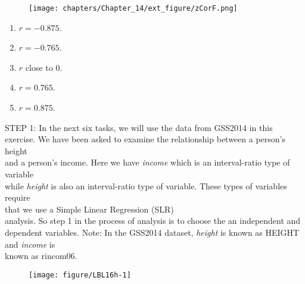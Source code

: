 \documentclass[11pt]{book}\usepackage[]{graphicx}\usepackage[]{color}
\begin{document}
\begin{exercises}
\begin{exercise}
\begin{figure}[htbp] %
   \centering
   \texttt{[image: chapters/Chapter\_14/ext\_figure/zCorF.png]}
   \label{fig:f12_14}
\end{figure}

      \begin{enumerate}
      \item $r = -0.875$.
      \item $r = -0.765$.
      \item $r$ close to 0.
      \item $r = 0.765$.
      \item $r = 0.875$.
      \end{enumerate}



    \end{exercise}
    \begin{solution}  %
    
       
    \end{solution}


  \begin{exercise} %

    STEP 1: In the next six tasks, we will use the data from GSS2014 in this exercise.  We have been asked to examine the relationship between a person's height \\ and a person's income.  Here we have {\textit{income}} which is an  interval-ratio type of variable  \\ while {\textit{height}} is also an interval-ratio type of variable.  These types of variables require \\ that we use a Simple Linear Regression (SLR) \\ analysis.  So step 1 in the process of analysis is to choose the an independent and dependent variables.  Note: In the GSS2014 dataset, {\textit{height}} is  known as HEIGHT and {\textit{income}} is \\ known as rincom06.

\begin{figure}[ht]

{\centering \texttt{[image: figure/LBL16h-1]} 

}
\end{figure}
\end{exercise}
\end{exercises}
\end{document}
